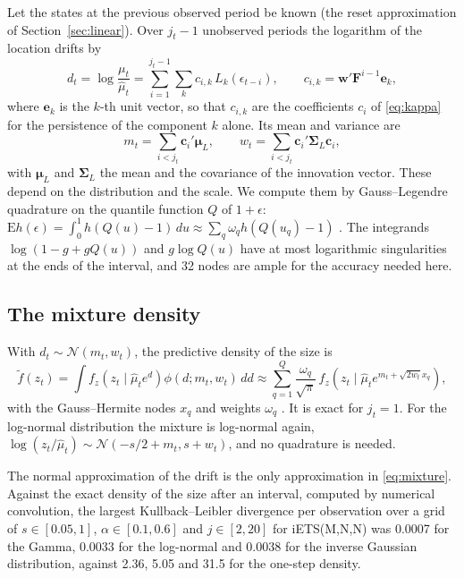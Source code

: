 \documentclass[11pt,a4paper]{article}
\newcommand{\vect}[1]{\mathbf{#1}}
\newcommand{\E}{\mathrm{E}}
\theoremstyle{remark}
\begin{document}
Let the states at the previous observed period be known (the reset approximation of
Section~\ref{sec:linear}). Over $j_t - 1$ unobserved periods the logarithm of the location drifts by
\begin{equation}
d_t = \log\frac{\mu_t}{\hat\mu_t} = \sum_{i=1}^{j_t-1}\sum_k c_{i,k}\,L_k(\epsilon_{t-i}),
\qquad c_{i,k} = \vect w'\vect F^{i-1}\vect e_k ,
\label{eq:drift}
\end{equation}
where $\vect e_k$ is the $k$-th unit vector, so that $c_{i,k}$ are the coefficients $c_i$ of
\eqref{eq:kappa} for the persistence of the component $k$ alone. Its mean and variance are
\begin{equation}
m_t = \sum_{i<j_t}\vect c_i'\boldsymbol\mu_L, \qquad
w_t = \sum_{i<j_t}\vect c_i'\boldsymbol\Sigma_L\vect c_i,
\label{eq:driftmoments}
\end{equation}
with $\boldsymbol\mu_L$ and $\boldsymbol\Sigma_L$ the mean and the covariance of the innovation
vector. These depend on the distribution and the scale. We compute them by Gauss--Legendre
quadrature on the quantile function $Q$ of $1+\epsilon$:
$\E h(\epsilon) = \int_0^1 h(Q(u)-1)\,du \approx \sum_q \omega_q h(Q(u_q)-1)$
\citep{GolubWelsch1969}. The integrands $\log(1-g+gQ(u))$ and $g\log Q(u)$ have at most logarithmic
singularities at the ends of the interval, and 32 nodes are ample for the accuracy needed here.

\subsection{The mixture density}

With $d_t\sim\mathcal N(m_t, w_t)$, the predictive density of the size is
\begin{equation}
\tilde f(z_t) = \int f_z\!\left(z_t\mid\hat\mu_t e^{d}\right)\phi(d; m_t, w_t)\,dd
\approx \sum_{q=1}^{Q}\frac{\omega_q}{\sqrt\pi}\,
f_z\!\left(z_t\mid\hat\mu_t e^{m_t + \sqrt{2w_t}x_q}\right),
\label{eq:mixture}
\end{equation}
with the Gauss--Hermite nodes $x_q$ and weights $\omega_q$ \citep{LiuPierce1994}. It is exact for
$j_t = 1$. For the log-normal distribution the mixture is log-normal again,
$\log(z_t/\hat\mu_t)\sim\mathcal N(-s/2 + m_t, s + w_t)$, and no quadrature is needed.

The normal approximation of the drift is the only approximation in \eqref{eq:mixture}. Against the
exact density of the size after an interval, computed by numerical convolution, the largest
Kullback--Leibler divergence per observation over a grid of $s\in[0.05,1]$, $\alpha\in[0.1,0.6]$
and $j\in[2,20]$ for iETS(M,N,N) was 0.0007 for the Gamma, 0.0033 for the log-normal and 0.0038 for
the inverse Gaussian distribution, against 2.36, 5.05 and 31.5 for the one-step density.
\end{document}
